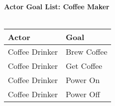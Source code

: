 \documentclass[letterpaper]{article}
\begin{document}
\noindent
\textbf{Actor Goal List:  Coffee Maker}\\\\
\vspace{4ex}
\begin{tabular}{|p{5cm}|p{5cm}|}\hline
\textbf{Actor} & \textbf{Goal}\\\hline
Coffee Drinker & Brew Coffee\\\hline
Coffee Drinker & Get Coffee\\\hline
Coffee Drinker & Power On\\\hline
Coffee Drinker & Power Off\\\hline
\end{tabular}
\end{document}
